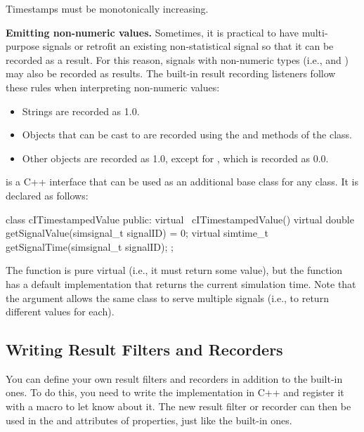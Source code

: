 Timestamps must be monotonically increasing.

\textbf{Emitting non-numeric values.} Sometimes, it is practical to have
multi-purpose signals or retrofit an existing non-statistical signal so that it
can be recorded as a result. For this reason, signals with non-numeric types
(i.e.,  and ) may also be recorded as results.
The built-in result recording listeners follow these rules when interpreting
non-numeric values:

\begin{itemize}
  \item Strings are recorded as 1.0.
  \item Objects that can be cast to  are recorded
     using the  and  methods of the class.
  \item Other objects are recorded as 1.0, except for , which is recorded as 0.0.
\end{itemize}

 is a C++ interface that can be used as an additional
base class for any class. It is declared as follows:

\begin{cpp}
class cITimestampedValue {
    public:
        virtual ~cITimestampedValue() {}
        virtual double getSignalValue(simsignal_t signalID) = 0;
        virtual simtime_t getSignalTime(simsignal_t signalID);
};
\end{cpp}

The  function is pure virtual (i.e., it must return some value),
but the  function has a default implementation that
returns the current simulation time. Note that the  argument
allows the same class to serve multiple signals (i.e., to return different values for each).

\subsection{Writing Result Filters and Recorders}
\label{sec:simple-modules:writing-result-filters}

You can define your own result filters and recorders in addition to the
built-in ones. To do this, you need to write the implementation in C++ and
register it with a macro to let {\opp} know about it. The new result filter
or recorder can then be used in the  and  attributes
of  properties, just like the built-in ones.

